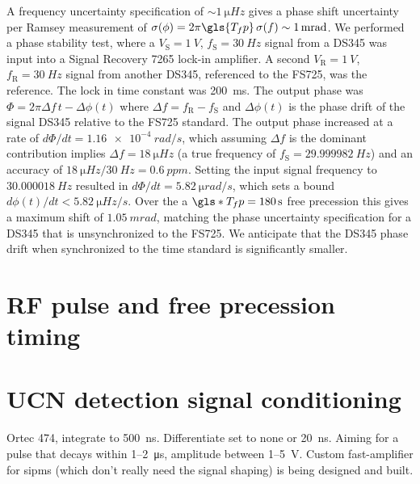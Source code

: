 A frequency uncertainty specification of $\sim \qty{1}{\micro Hz}$ gives a phase shift uncertainty per Ramsey measurement of $\sigma(\phi)=2\pi\gls{T_fp}\,\sigma(f)\sim \qty{1}{mrad}$. We performed a phase stability test, where a $V_\text{S}=\qty{1}{V}$, $f_\text{S}=\qty{30}{Hz}$ signal from a DS345 was input into a Signal Recovery 7265 lock-in amplifier. A second $V_\text{R}=\qty{1}{V}$, $f_\text{R}=\qty{30}{Hz}$ signal from another DS345, referenced to the FS725, was the reference. The lock in time constant was \qty{200}{ms}. The output phase was $\Phi=2\pi \Delta f\,t-\Delta\phi(t)$ where $\Delta f=f_\text{R}-f_\text{S}$ and $\Delta\phi(t)$ is the phase drift of the signal DS345 relative to the FS725 standard. The output phase increased at a rate of $d\Phi/dt=\qty{1.16e-4}{rad\per s}$, which assuming $\Delta f$ is the dominant contribution implies $\Delta f=\qty{18}{\micro Hz}$ (a true frequency of $f_\text{S}=\qty{29.999982}{Hz}$) and an accuracy of $\qty{18}{\micro Hz}/\qty{30}{Hz}=\qty{0.6}{ppm}$. Setting the input signal frequency to $\qty{30.000018}{Hz}$ resulted in $d\Phi/dt=\qty{5.82}{\micro rad\per s}$, which sets a bound $d\phi(t)/dt<\qty{5.82}{\micro Hz\per s}$. Over the a $\gls*{T_fp}=\qty{180}{s}$ free precession this gives a maximum shift of $\qty{1.05}{mrad}$, matching the phase uncertainty specification for a DS345 that is unsynchronized to the FS725. We anticipate that the DS345 phase drift when synchronized to the time standard is significantly smaller.


\section{RF pulse and free precession timing}\label{sec:pulse_gates}



\cite{dg535_manual,  bnc_577_manual}


\section{UCN detection signal conditioning}


Ortec 474, integrate to \qty{500}{\nano\second}. Differentiate set to none or \qty{20}{\nano\second}. Aiming for a pulse that decays within 1--\qty{2}{\micro \second}, amplitude between 1--\qty{5}{\volt}. Custom fast-amplifier for \acrshort*{sipm}s (which don't really need the signal shaping) is being designed and built.


